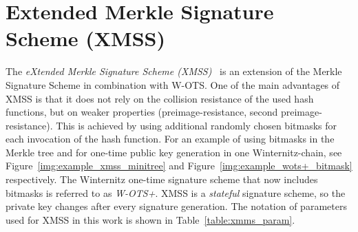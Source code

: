 

\section{Extended Merkle Signature Scheme (XMSS)}
The \textit{eXtended Merkle Signature Scheme (XMSS)}~\cite{xmss_RFC8391} is an extension of the Merkle Signature Scheme in combination with W-OTS. One of the main advantages of XMSS is that it does not rely on the collision resistance of the used hash functions, but on weaker properties (preimage-resistance, second preimage-resistance). This is achieved by using additional randomly chosen bitmasks for each invocation of the hash function.
For an example of using bitmasks in the Merkle tree and for one-time public key generation in one Winternitz-chain,  see Figure~\ref{img:example_xmss_minitree} and Figure~\ref{img:example_wots+_bitmask} respectively. The Winternitz one-time signature scheme that now includes bitmasks is referred to as \textit{W-OTS+}. XMSS is a \textit{stateful} signature scheme, so the private key changes after every signature generation. The notation of parameters used for XMSS in this work is shown in Table~\ref{table:xmms_param}.



